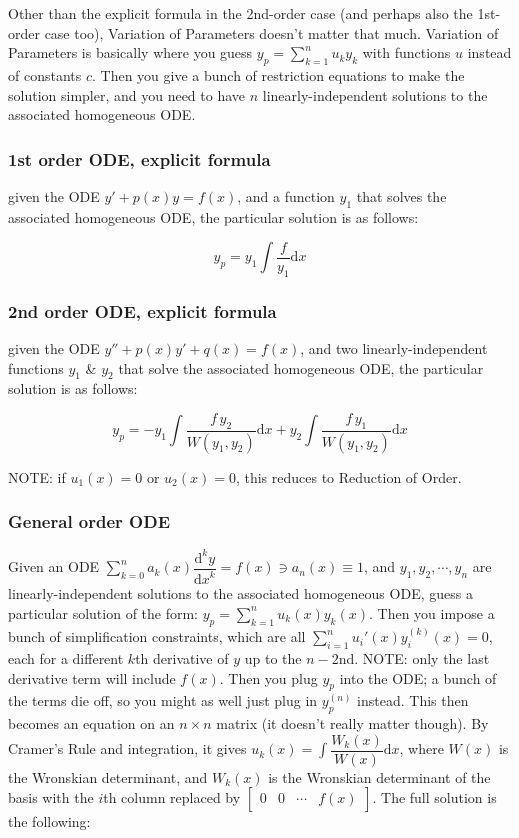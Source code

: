 \documentclass[12pt]{article}
\newcommand \dstyle \displaystyle
\renewcommand \d [1] {\mathrm{d}{#1}}
\newcommand \dx {{\d x}}
\newcommand \ndydx [1] {\dfrac{\mathrm{d}^{#1} y}{\dx^{#1}}}
\begin{document}
Other than the explicit formula in the 2nd-order case (and perhaps also the 1st-order case too), Variation of Parameters doesn't matter that much. Variation of Parameters is basically where you guess $\dstyle y_p = \sum_{k=1}^n u_k y_k$ with functions $u$ instead of constants $c$. Then you give a bunch of restriction equations to make the solution simpler, and you need to have $n$ linearly-independent solutions to the associated homogeneous ODE. 

\subsubsection{1st order ODE, explicit formula}

given the ODE $y' + p(x) y = f(x)$, and a function $y_1$ that solves the associated homogeneous ODE, the particular solution is as follows:

\begin{equation}
	y_p = y_1 \! \int \! \dfrac f {y_1} \dx
\end{equation}

\subsubsection{2nd order ODE, explicit formula}

given the ODE $y'' + p(x) y' + q(x) = f(x)$, and two linearly-independent functions $y_1$ \& $y_2$ that solve the associated homogeneous ODE, the particular solution is as follows:

\begin{equation}
	y_p = -y_1 \! \int \! \dfrac{f \, y_2}{W(y_1, y_2)} \dx + y_2 \! \int \! \dfrac{f \, y_1}{W(y_1, y_2)} \dx
\end{equation}

\noindent NOTE: if $u_1(x) = 0$ or $u_2(x) = 0$, this reduces to Reduction of Order.

\subsubsection{General order ODE}

Given an ODE $\dstyle \sum_{k=0}^n a_k(x) \ndydx k = f(x) \ni a_n(x) \equiv 1$, and $y_1, y_2, \cdots, y_n$ are linearly-independent solutions to the associated homogeneous ODE, guess a particular solution of the form: $\dstyle y_p = \sum_{k=1}^n u_k(x) y_k(x)$. Then you impose a bunch of simplification constraints, which are all $\dstyle \sum_{i=1}^n u_i'(x) y_i^{(k)}(x) = 0$, each for a different $k$th derivative of $y$ up to the $n-2$nd. NOTE: only the last derivative term will include $f(x)$. Then you plug $y_p$ into the ODE; a bunch of the terms die off, so you might as well just plug in $y_p^{(n)}$ instead. This then becomes an equation on an $n \times n$ matrix (it doesn't really matter though). By Cramer's Rule and integration, it gives $\dstyle u_k(x) = \int \dfrac{W_k(x)}{W(x)} \dx$, where $W(x)$ is the Wronskian determinant, and $W_k(x)$ is the Wronskian determinant of the basis with the $i$th column replaced by $\dstyle \begin{bmatrix} 0 & 0 & \cdots & f(x)\end{bmatrix}$. The full solution is the following:
\end{document}
